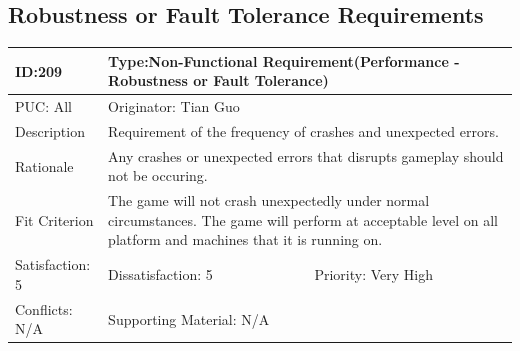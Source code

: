 \documentclass{article}
\begin{document}
	\subsection{Robustness or Fault Tolerance Requirements}
	\begin{table}[H]
		\begin{tabular}{|l|l|l|}
			\hline
			ID:209 & \multicolumn{2}{l|}{Type:Non-Functional Requirement(Performance - Robustness or Fault Tolerance)} \\ \hline
			PUC: All & \multicolumn{2}{l|}{Originator: Tian Guo} \\ \hline
			Description & \multicolumn{2}{m{0.85\textwidth}|}{Requirement of the frequency of crashes and unexpected errors.} \\ \hline
			Rationale & \multicolumn{2}{m{0.85\textwidth}|}{Any crashes or unexpected errors that disrupts gameplay should not be occuring.} \\ \hline
			Fit Criterion & \multicolumn{2}{m{0.85\textwidth}|}{The game will not crash unexpectedly under normal circumstances. The game will perform at acceptable level on all platform and machines that it is running on.} \\ \hline
			Satisfaction: 5 & Dissatisfaction: 5 & Priority: Very High \\ \hline
			Conflicts: N/A & \multicolumn{2}{l|}{Supporting Material: N/A} \\ \hline
		\end{tabular}
	\end{table}
\end{document}
